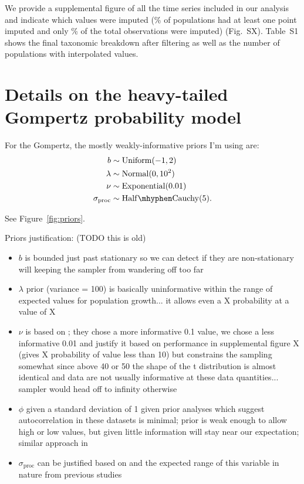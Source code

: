 \documentclass[11pt]{article}
\begin{document}
We provide a supplemental figure of all the time series included in our analysis and indicate which values were imputed (\percImputedPops\% of populations had at least one point imputed and only \percImputedPoints\% of the total observations were imputed) (Fig.\ SX). Table~S1 shows the final taxonomic breakdown after filtering as well as the number of populations with interpolated values.

\section{Details on the heavy-tailed Gompertz probability model}

For the Gompertz, the mostly weakly-informative priors I'm using are:
\begin{align*}
b &\sim \mathrm{Uniform}(-1, 2)\\
\lambda &\sim \mathrm{Normal}(0, 10^2)\\
\nu &\sim \mathrm{Exponential}(0.01)\\
\sigma_\mathrm{proc} &\sim \mathrm{Half\mhyphen Cauchy} (5).
\end{align*}

See Figure~\ref{fig:priors}.

Priors justification: (TODO this is old)

\begin{itemize}
\item $b$ is bounded just past stationary so we can detect if they are non-stationary will keeping the sampler from wandering off too far

\item $\lambda$ prior (variance = 100) is basically uninformative within the range of expected values for population growth... it allows even a X probability at a value of X

\item $\nu$ is based on \citet{fernandez1998}; they chose a more informative 0.1 value, we chose a less informative 0.01 and justify it based on performance in supplemental figure X (gives X probability of value less than 10) but constrains the sampling somewhat since above 40 or 50 the shape of the t distribution is almost identical and data are not usually informative at these data quantities... sampler would head off to infinity otherwise

\item $\phi$ given a standard deviation of 1 given prior analyses which suggest autocorrelation in these datasets is minimal; prior is weak enough to allow high or low values, but given little information will stay near our expectation; similar approach in \citep{thorson2014a}

\item $\sigma_\mathrm{proc}$ can be justified based on \citet{gelman2006c} and the expected range of this variable in nature from previous studies \citep[e.g.][]{connors2014}
\end{itemize}
\end{document}
